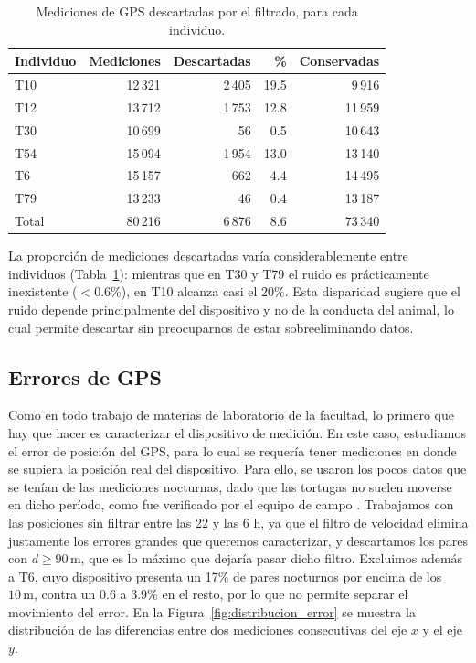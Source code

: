 \begin{table}[ht]
    \centering
    \caption{Mediciones de GPS descartadas por el filtrado, para cada individuo.\label{tab:filtrado}}
    \begin{tabular}{lrrrr}
    \hline
    Individuo & Mediciones & Descartadas & \% & Conservadas \\
    \hline
    T10 & 12\,321 & 2\,405 & 19.5 & 9\,916 \\
    T12 & 13\,712 & 1\,753 & 12.8 & 11\,959 \\
    T30 & 10\,699 & 56 & 0.5 & 10\,643 \\
    T54 & 15\,094 & 1\,954 & 13.0 & 13\,140 \\
    T6  & 15\,157 & 662 & 4.4 & 14\,495 \\
    T79 & 13\,233 & 46 & 0.4 & 13\,187 \\
    \hline
    Total & 80\,216 & 6\,876 & 8.6 & 73\,340 \\
    \hline
    \end{tabular}
\end{table}

La proporción de mediciones descartadas varía considerablemente entre individuos (Tabla~\ref{tab:filtrado}): mientras que en T30 y T79 el ruido es 
prácticamente inexistente ($ < 0.6\%$), en T10 alcanza casi el $20\%$. Esta disparidad sugiere que el ruido depende principalmente del dispositivo 
y no de la conducta del animal, lo cual permite descartar sin preocuparnos de estar sobreeliminando datos.

\subsection{Errores de GPS}\label{I:ruido_noche}

Como en todo trabajo de materias de laboratorio de la facultad, lo primero que hay que hacer es caracterizar el dispositivo de medición. En este caso,
estudiamos el error de posición del GPS, para lo cual se requería tener mediciones en donde se supiera la posición real del dispositivo. Para ello,
se usaron los pocos datos que se tenían de las mediciones nocturnas, dado que las tortugas no suelen moverse en dicho período, como fue verificado por el equipo
de campo \cite{madile2023}. Trabajamos con las posiciones sin filtrar entre las 22 y las 6 h, ya que el filtro de velocidad elimina justamente los errores grandes que queremos 
caracterizar, y descartamos los pares con $d\geq90\,\mathrm{m}$, que es lo máximo que dejaría pasar dicho filtro. Excluimos además a T6, cuyo dispositivo presenta un 17\% de pares 
nocturnos por encima de los $10\,\mathrm{m}$, contra un 0.6 a 3.9\% en el resto, por lo que no permite separar el movimiento del error. En la Figura~\ref{fig:distribucion_error} se muestra la distribución 
de las diferencias entre dos mediciones consecutivas del eje $x$ y el eje $y$.


